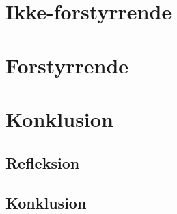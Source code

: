 

\part{Ikke-forstyrrende}



\part{Forstyrrende}




\part{Konklusion}


\chapter{Refleksion}


\chapter{Konklusion}


\appendix




